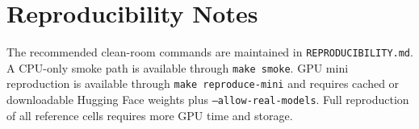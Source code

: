 \section{Reproducibility Notes}

The recommended clean-room commands are maintained in
\texttt{REPRODUCIBILITY.md}. A CPU-only smoke path is available through
\texttt{make smoke}. GPU mini reproduction is available through
\texttt{make reproduce-mini} and requires cached or downloadable Hugging Face
weights plus \texttt{--allow-real-models}. Full reproduction of all reference
cells requires more GPU time and storage.
